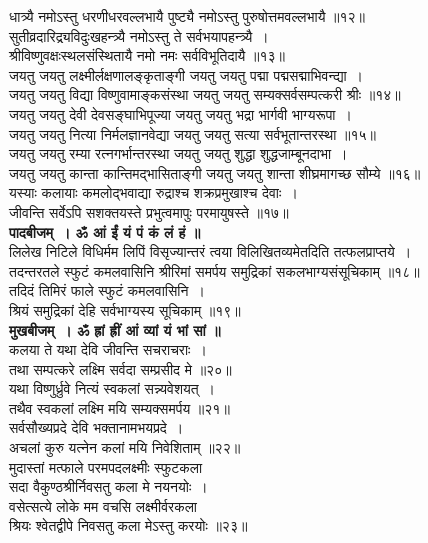 \documentclass[twoside,top=1.7cm, bottom=1.7cm, outer=1cm,landscape, inner=1.5cm,a5paper,]{book}
\begin{document}
\begin{center}
धात्र्यै नमोऽस्तु धरणीधरवल्लभायै पुष्ट्यै नमोऽस्तु पुरुषोत्तमवल्लभायै ॥१२॥\\[10pt]
सुतीव्रदारिद्र्यविदुःखहन्त्र्यै नमोऽस्तु ते सर्वभयापहन्त्र्यै~।\\
श्रीविष्णुवक्षःस्थलसंस्थितायै नमो नमः सर्वविभूतिदायै ॥१३॥\\
\newpage
जयतु जयतु लक्ष्मीर्लक्षणालङ्कृताङ्गी जयतु जयतु पद्मा पद्मसद्माभिवन्द्या~।\\
जयतु जयतु विद्या विष्णुवामाङ्कसंस्था जयतु जयतु सम्यक्सर्वसम्पत्करी श्रीः ॥१४॥\\[10pt]
जयतु जयतु देवी  देवसङ्घाभिपूज्या जयतु जयतु भद्रा भार्गवी भाग्यरूपा~।\\
जयतु जयतु नित्या निर्मलज्ञानवेद्या जयतु जयतु सत्या सर्वभूतान्तरस्था ॥१५॥\\[10pt]
जयतु जयतु रम्या रत्नगर्भान्तरस्था जयतु जयतु शुद्धा शुद्धजाम्बूनदाभा~।\\
जयतु जयतु कान्ता कान्तिमद्भासिताङ्गी जयतु जयतु शान्ता शीघ्रमागच्छ सौम्ये ॥१६॥\\[10pt]
यस्याः कलायाः कमलोद्भवाद्या रुद्राश्च शक्रप्रमुखाश्च देवाः~।\\
जीवन्ति सर्वेऽपि सशक्तयस्ते प्रभुत्वमापुः परमायुषस्ते ॥१७॥\\[10pt]
{\bfseries पादबीजम्~। ॐ आं ईं यं पं कं लं हं ॥}\\[10pt]

लिलेख निटिले विधिर्मम लिपिं विसृज्यान्तरं
त्वया विलिखितव्यमेतदिति तत्फलप्राप्तये~।\\
तदन्तरतले स्फुटं कमलवासिनि श्रीरिमां
समर्पय समुद्रिकां सकलभाग्यसंसूचिकाम् ॥१८॥\\[10pt]
तदिदं तिमिरं फाले स्फुटं कमलवासिनि~।\\
श्रियं समुद्रिकां देहि सर्वभाग्यस्य सूचिकाम् ॥१९॥\\[10pt]

{\bfseries मुखबीजम्~। ॐ ह्रां ह्रीं आं व्यां यं भां सां  ॥}\\[10pt]

कलया ते यथा देवि जीवन्ति सचराचराः~।\\
तथा सम्पत्करे लक्ष्मि सर्वदा सम्प्रसीद मे ॥२०॥\\[10pt]

यथा विष्णुर्ध्रुवे नित्यं स्वकलां सन्न्यवेशयत्~।\\
तथैव स्वकलां लक्ष्मि मयि सम्यक्समर्पय ॥२१॥\\[10pt]

सर्वसौख्यप्रदे देवि भक्तानामभयप्रदे~।\\
अचलां कुरु यत्नेन कलां मयि निवेशिताम् ॥२२॥\\[10pt]
मुदास्तां मत्फाले परमपदलक्ष्मीः स्फुटकला\\
सदा वैकुण्ठश्रीर्निवसतु कला मे नयनयोः~।\\
वसेत्सत्ये लोके मम वचसि लक्ष्मीर्वरकला\\
श्रियः श्वेतद्वीपे निवसतु कला मेऽस्तु करयोः ॥२३॥\\[10pt]


\end{center}
\end{document}
